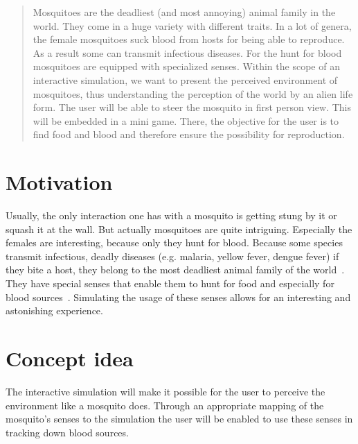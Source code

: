 \documentclass{acm_proc_article-sp}
\begin{document}
\maketitle
\begin{abstract}
Mosquitoes are the deadliest (and most annoying) animal family in the world. They come in a huge variety with different traits. In a lot of genera, the female mosquitoes suck blood from hosts for being able to reproduce. As a result some can transmit infectious diseases. For the hunt for blood mosquitoes are equipped with specialized senses. Within the scope of an interactive simulation, we want to present the perceived environment of mosquitoes, thus understanding the perception of the world by an alien life form. The user will be able to steer the mosquito in first person view. This will be embedded in a mini game. There, the objective for the user is to find food and blood and therefore ensure the possibility for reproduction.
\end{abstract}






\section{Motivation}
Usually, the only interaction one has with a mosquito is getting stung by it or squash it at the wall. But actually mosquitoes are quite intriguing. Especially the females are interesting, because only they hunt for blood. Because some species transmit infectious, deadly diseases (e.g. malaria, yellow fever, dengue fever) if they bite a host, they belong to the most deadliest animal family of the world~\cite{billG}. They have special senses that enable them to hunt for food and especially for blood sources~\cite{wiki_mosq}. Simulating the usage of these senses allows for an interesting and astonishing experience.


\section{Concept idea}
The interactive simulation will make it possible for the user to perceive the environment like a mosquito does. Through an appropriate mapping of the mosquito's senses to the simulation the user will be enabled to use these senses in tracking down blood sources.
\end{document}
